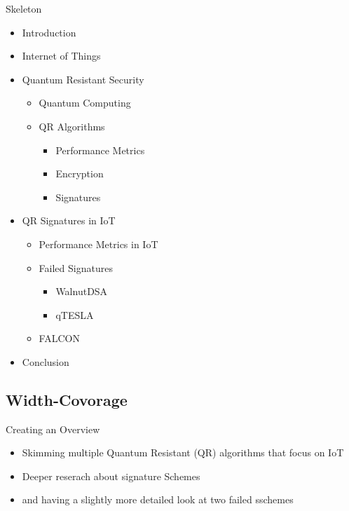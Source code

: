 \documentclass[ucs,10pt]{beamer}
\begin{document}
\begin{frame}{Skeleton}
  \begin{itemize}
      \item Introduction
    
      \item Internet of Things
      
      \item Quantum Resistant Security
          \begin{itemize}
            \item Quantum Computing
            \item QR Algorithms
            \begin{itemize}
              \item Performance Metrics
              \item Encryption
              \item Signatures
            \end{itemize}
          \end{itemize}
      
      \item QR Signatures in IoT 
      \begin{itemize}
        \item Performance Metrics in IoT
        \item Failed Signatures
        \begin{itemize}
          \item WalnutDSA
          \item qTESLA
        \end{itemize}
        \item FALCON
      \end{itemize}
      
      
      \item {Conclusion}
  \end{itemize}
  
\end{frame}

\subsection{Width-Covorage}
\begin{frame}{Creating an Overview}
  \begin{itemize}
    \item Skimming multiple Quantum Resistant (QR) algorithms \cite{QR_algs,PQClean-GH} that focus on IoT \cite{QR_comparison,Energy_comp,QR_Iot_Lattice,QR_IoT,QR_IoT_Energy} 
    \item Deeper reserach about signature Schemes \cite{QR_sigs}
    \item and having a slightly more detailed look at two failed sschemes \cite{WalnutDSA,WalnutDSA_broken,qtesla,qtesla_masked}
    
  \end{itemize}
\end{frame}
\end{document}
